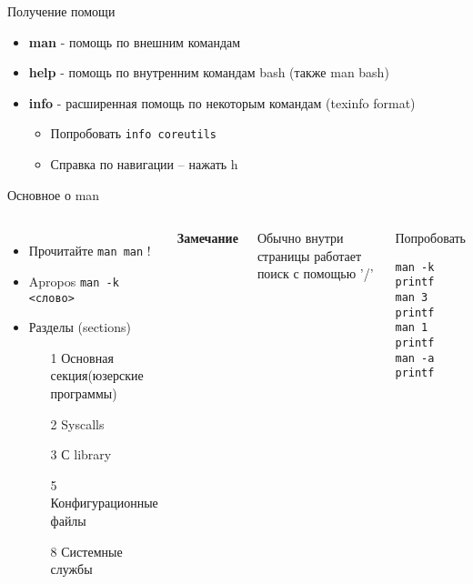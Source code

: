 \begin{frame}[fragile]{Получение помощи}
  \begin{itemize}
    \pause
    \item \textbf{man} - помощь по внешним командам
    \pause
    \item \textbf{help} - помощь по внутренним командам bash (также man bash)
    \pause
    \item \textbf{info} - расширенная помощь по некоторым командам (texinfo format)
      \begin{itemize}
       \item   Попробовать {\tt info coreutils}
       \item   Справка по навигации -- нажать h
      \end{itemize}
  \end{itemize}
\end{frame}

\begin{frame}[fragile]{Основное о man}
\begin{columns}
	\column{2.2in}
		\begin{itemize}
			\item Прочитайте {\tt man man} !
			\item Apropos {\tt man -k <слово>}
			\item Разделы (sections)
				\begin{itemize}
					\item[1] Основная секция(юзерские программы)
					\item[2] Syscalls
					\item[3] С library
					\item[5] Конфигурационные файлы
					\item[8] Системные службы
				\end{itemize}
		\end{itemize}
	  \textbf{Замечание}

	  Обычно внутри страницы работает поиск с помощью '/'
	\pause 
	\column{1in}
		\begin{block}{Попробовать}
			\begin{lstlisting}
man -k printf
man 3 printf
man 1 printf
man -a printf
			\end{lstlisting}
		\end{block}
	\end{columns}
\end{frame}


